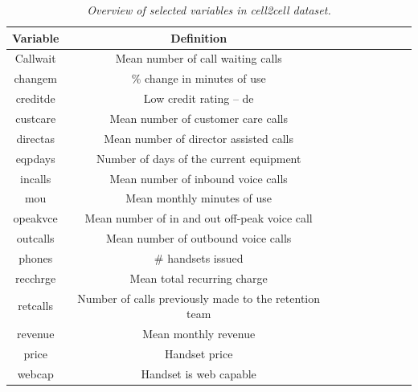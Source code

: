 \documentclass[11pt,onside,a4paper,fleqn]{report}
\begin{document}
\begin{table}[!h]

    \caption{\small{\it{Overview of selected variables in cell2cell dataset.}}}
    \label{table.variable}
    \begin{tabular}{c | cccccccc }
    \hline
      Variable          & Definition      \\ \hline
      Callwait          & Mean number of call waiting calls\\
      changem           & $\%$ change in minutes of use\\ 
      creditde          & Low credit rating – de\\
      custcare          & Mean number of customer care calls\\
      directas          & Mean number of director assisted calls\\
      eqpdays           & Number of days of the current equipment\\
      incalls           & Mean number of inbound voice calls\\
      mou               & Mean monthly minutes of use\\
      opeakvce          & Mean number of in and out off-peak voice call\\
      outcalls          & Mean number of outbound voice calls\\
      phones            & $\#$ handsets issued\\
      recchrge          & Mean total recurring charge\\
      retcalls          & Number of calls previously made to the retention team\\
      revenue           & Mean monthly revenue\\
      price             & Handset price\\
      webcap            & Handset is web capable\\ \hline
    \end{tabular}
\end{table}
\end{document}
